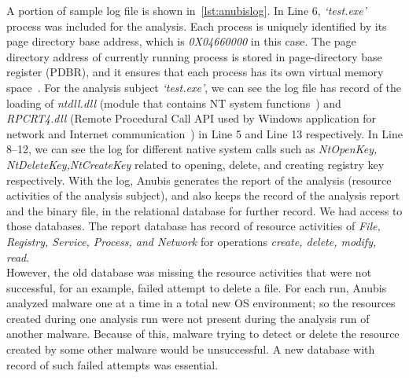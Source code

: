 A portion of sample log file is shown in~\autoref{lst:anubislog}.
In Line 6, \emph{`test.exe'} process was included for the analysis.
Each process is uniquely identified by its page directory base address, which is \emph{0X04660000} in this case. %
The page directory address of currently running process is stored in page-directory base register (PDBR), and it ensures that each process has its own virtual memory space~\cite[]{ttanalyze}.
For the analysis subject \emph{`test.exe'}, we can see the log file has record of the loading of \emph{ntdll.dll} (module that contains NT system functions~\cite[]{ntdll}) and \emph{RPCRT4.dll} (Remote Procedural Call API used by Windows application for network and Internet communication~\cite[]{rpcrt}) in Line 5 and Line 13 respectively.
In Line 8--12, we can see the log for different native system calls such as \emph{NtOpenKey, NtDeleteKey,NtCreateKey} related to opening, delete, and creating registry key respectively.
With the log, Anubis generates the report of the analysis (resource activities of the analysis subject), and also keeps the record of the analysis report and the binary file, in the relational database for further record.
We had access to those databases.
The report database has record of resource activities of \emph{File, Registry, Service, Process, and Network} for operations \emph{create, delete, modify, read}.\\

However, the old database was missing the resource activities that were not successful, for an example, failed attempt to delete a file.
For each run, Anubis analyzed malware one at a time in a total new OS environment; so the resources created during one analysis run were not present during the analysis run of another malware.
Because of this, malware trying to detect or delete the resource created by some other malware would be unsuccessful.
A new database with record of such failed attempts was essential.\\


